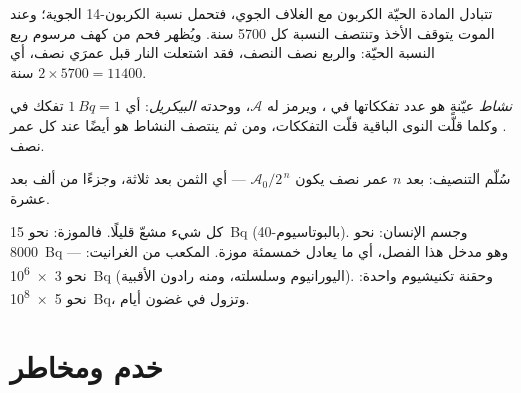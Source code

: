 \begin{example}\label{ex:g11:nucleus-radioactivity:dating}
تتبادل المادة الحيّة الكربون مع الغلاف الجوي، فتحمل
نسبة الكربون-14 الجوية؛ وعند الموت يتوقف الأخذ وتنتصف
النسبة كل \num{5700} سنة. ويُظهر فحم من كهف مرسوم
ربع النسبة الحيّة: والربع نصف النصف، فقد اشتعلت
النار قبل عمرَي نصف، أي $2 \times \num{5700} = \num{11400}$ سنة.
\end{example}

\begin{definition}[النشاط]\label{def:g11:nucleus-radioactivity:activity}
\emph{نشاط} عيّنةٍ هو عدد
تفككاتها في ، ويرمز له $\mathcal A$، ووحدته \emph{البيكريل}:
أي $\qty{1}{Bq} = 1$ تفكك في . وكلما قلّت النوى الباقية قلّت
التفككات، ومن ثم ينتصف النشاط هو أيضًا عند كل عمر نصف.
\end{definition}

\begin{omfigure}

{\small سُلّم التنصيف: بعد $n$ عمر نصف يكون 
$\mathcal A_0/2^{\,n}$ --- أي الثمن بعد ثلاثة، وجزءًا من ألف بعد عشرة.}
\end{omfigure}

\begin{example}\label{ex:g11:nucleus-radioactivity:orders}
كل شيء مشعّ قليلًا. فالموزة: نحو \qty{15}{Bq}
(بالبوتاسيوم-40). وجسم الإنسان: نحو \qty{8000}{Bq} --- وهو مدخل هذا الفصل،
أي ما يعادل خمسمئة موزة.  المكعب من الغرانيت: نحو
\qty{3e6}{Bq} (اليورانيوم وسلسلته، ومنه رادون الأقبية). وحقنة
تكنيشيوم واحدة: نحو \qty{5e8}{Bq}، وتزول في غضون أيام.
\end{example}

\section{خدم ومخاطر}

